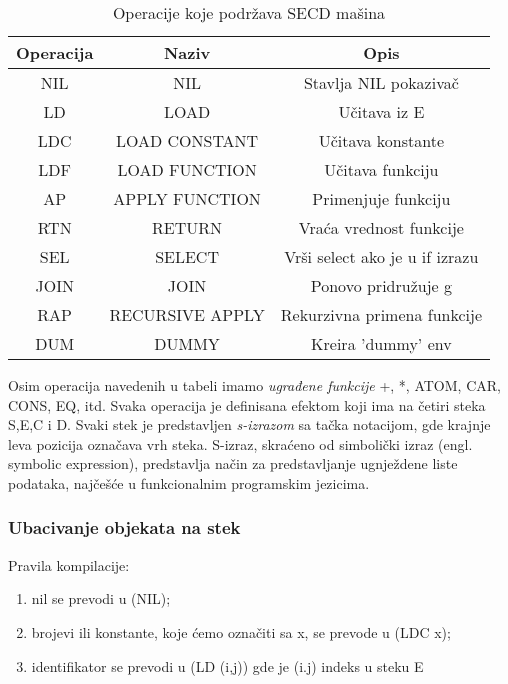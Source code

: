 \begin{table}[h!]
	\begin{center}
	\caption{Operacije koje podržava SECD mašina}
	\begin{tabular}{|c|c|c|} \hline
	Operacija&Naziv&Opis\\ \hline
	NIL & NIL & Stavlja NIL pokazivač\\ \hline
	LD & LOAD & Učitava iz E \\ \hline
	LDC & LOAD CONSTANT & Učitava konstante\\ \hline
	LDF & LOAD FUNCTION & Učitava funkciju \\ \hline
	AP & APPLY FUNCTION & Primenjuje funkciju\\ \hline
	RTN & RETURN & Vraća vrednost funkcije \\ \hline
	SEL & SELECT & Vrši select ako je u if izrazu\\ \hline
	JOIN & JOIN & Ponovo pridružuje g\\ \hline
	RAP & RECURSIVE APPLY & Rekurzivna primena funkcije\\ \hline
	DUM & DUMMY & Kreira 'dummy' env \\ \hline
	\end{tabular}
	\label{tab:tabelaInstr}
	\end{center}
\end{table}
Osim operacija navedenih u tabeli imamo {\em ugrađene funkcije} +, *, ATOM, CAR, CONS, EQ, itd. Svaka operacija je definisana efektom koji ima na četiri steka S,E,C i D. Svaki stek je predstavljen {\em s-izrazom} sa tačka notacijom, gde krajnje leva pozicija označava vrh steka. S-izraz, skraćeno od simbolički izraz (engl. symbolic expression), predstavlja način za predstavljanje ugnježdene liste podataka, najčešće u funkcionalnim programskim jezicima.

\subsubsection{Ubacivanje objekata na stek}

Pravila kompilacije:
\begin{enumerate}
\item nil se prevodi u (NIL);
\item brojevi ili konstante, koje ćemo označiti sa x, se prevode u (LDC x);
\item identifikator se prevodi u (LD (i,j)) gde je (i.j) indeks u steku E
\end{enumerate}

